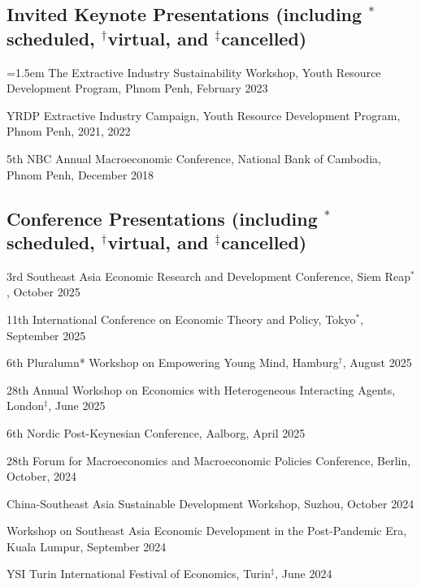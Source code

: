 \documentclass[10pt,a4paper]{article}
\begin{document}
	
\subsection*{Invited Keynote Presentations (including $^\ast$scheduled, $^\dag$virtual, and $^\ddag$cancelled)}

\hangindent=1.5em
The Extractive Industry Sustainability Workshop, Youth Resource Development Program, Phnom Penh, February 2023

YRDP Extractive Industry Campaign, Youth Resource Development Program, Phnom Penh, 2021, 2022

5th NBC Annual Macroeconomic Conference, National Bank of Cambodia, Phnom Penh, December 2018


\subsection*{Conference Presentations (including $^\ast$scheduled, $^\dag$virtual, and $^\ddag$cancelled)}

3rd Southeast Asia Economic Research and Development Conference, Siem Reap$^\ast$, October 2025

11th International Conference on Economic Theory and Policy, Tokyo$^\ast$, September 2025

6th Pluralumn* Workshop on Empowering Young Mind, Hamburg$^\dag$, August 2025
 
28th Annual Workshop on Economics with Heterogeneous Interacting Agents, London$^\ddag$, June 2025

6th Nordic Post-Keynesian Conference, Aalborg, April 2025

28th Forum for Macroeconomics and Macroeconomic Policies Conference, Berlin, October, 2024

China-Southeast Asia Sustainable Development Workshop, Suzhou, October 2024

Workshop on Southeast Asia Economic Development in the Post-Pandemic Era, Kuala Lumpur, September 2024

YSI Turin International Festival of Economics, Turin$^\ddag$, June 2024
\end{document}
